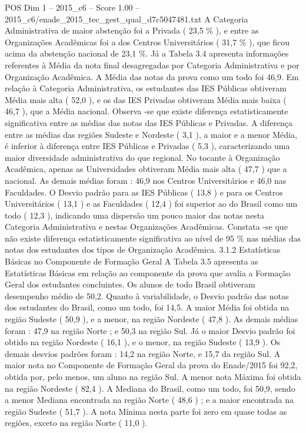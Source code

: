 \begin{textsample}{POS Dim 1 – 2015\_c6 – Score 1.00 – 2015\_c6/enade\_2015\_tec\_gest\_qual\_d7c5047481.txt}
A Categoria Administrativa de maior abstenção foi a Privada ( 23,5 \% ), e entre as Organizações Acadêmicas foi a dos Centros Universitários ( 31,7 \% ), que ficou acima da abstenção nacional de 23,1 \%.
Já a Tabela 3.4 apresenta informações referentes à Média da nota final desagregadas por Categoria Administrativa e por Organização Acadêmica.
A Média das notas da prova como um todo foi 46,9.
Em relação à Categoria Administrativa, os estudantes das IES Públicas obtiveram Média mais alta ( 52,0 ), e os das IES Privadas obtiveram Média mais baixa ( 46,7 ), que a Média nacional.
Observa -se que existe diferença estatisticamente significativa entre as médias das notas das IES Públicas e Privadas.
A diferença entre as médias das regiões Sudeste e Nordeste ( 3,1 ), a maior e a menor Média, é inferior à diferença entre IES Públicas e Privadas ( 5,3 ), caracterizando uma maior diversidade administrativa do que regional.
No tocante à Organização Acadêmica, apenas as Universidades obtiveram Média mais alta ( 47,7 ) que a nacional.
As demais médias foram : 46,9 nos Centros Universitários e 46,0 nas Faculdades.
O Desvio padrão para as IES Públicas ( 13,8 ) e para os Centros Universitários ( 13,1 ) e as Faculdades ( 12,4 ) foi superior ao do Brasil como um todo ( 12,3 ), indicando uma dispersão um pouco maior das notas nesta Categoria Administrativa e nestas Organizações Acadêmicas.
Constata -se que não existe diferença estatisticamente significativa ao nível de 95 \% nas médias das notas dos estudantes dos tipos de Organização Acadêmica. 3.1.2 Estatísticas Básicas no Componente de Formação Geral A Tabela 3.5 apresenta as Estatísticas Básicas em relação ao componente da prova que avalia a Formação Geral dos estudantes concluintes.
Os alunos de todo Brasil obtiveram desempenho médio de 50,2.
Quanto à variabilidade, o Desvio padrão das notas dos estudantes do Brasil, como um todo, foi 14,5.
A maior Média foi obtida na região Sudeste ( 50,9 ), e a menor, na região Nordeste ( 47,8 ).
As demais médias foram : 47,9 na região Norte ; e 50,3 na região Sul.
Já o maior Desvio padrão foi obtido na região Nordeste ( 16,1 ), e o menor, na região Sudeste ( 13,9 ).
Os demais desvios padrões foram : 14,2 na região Norte, e 15,7 da região Sul.
A maior nota no Componente de Formação Geral da prova do Enade/2015 foi 92,2, obtida por, pelo menos, um aluno na região Sul.
A menor nota Máxima foi obtida na região Nordeste ( 82,4 ).
A Mediana do Brasil, como um todo, foi 50,9, sendo a menor Mediana encontrada na região Norte ( 48,6 ) ; e a maior encontrada na região Sudeste ( 51,7 ).
A nota Mínima nesta parte foi zero em quase todas as regiões, exceto na região Norte ( 11,0 ).

\end{textsample}
